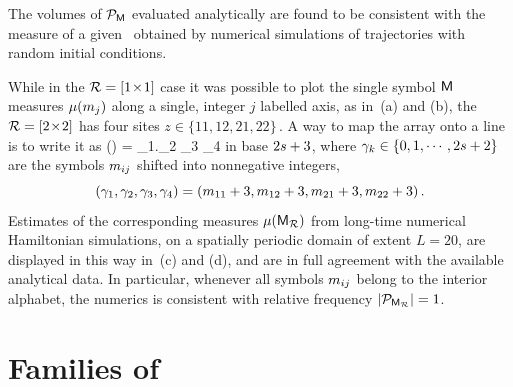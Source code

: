 \documentclass[12pt]{iopart}
\begin{document}
The  volumes  of $\mathcal{P}_{\mathsf{M}}$ evaluated analytically are found to be
consistent with the measure  of a given {\brick} \Mm\ obtained by
numerical simulations of trajectories with random initial conditions.

While in the $\mathcal{R}=[1\!\times\!1]$ case it was possible to plot the single
symbol {\brick} $\mathsf{M}$ measures ${\mu}({m_{j}})$ along a single, integer
$j$ labelled axis, as in \,(a) and (b), the $\mathcal{R} =
[2\!\times\!2]$ has four sites
\(
z\in\{11,12,21,22\}
\,.
\)
A way to map the array  onto a line is to write it as
\beq
\gamma(\MmR) = \gamma_1.\gamma_2 \gamma_3 \gamma_4
in base $\edit{2s}+3$, where
$\gamma_k\in\{0,1,\cdots,\edit{2s}+2\}$ are the symbols $\Ssym{ij}$
shifted into nonnegative integers,
\[
(\gamma_1,\gamma_2,\gamma_3,\gamma_4)
= (\Ssym{11}+3,\Ssym{12}+3,\Ssym{21}+3,\Ssym{22}+3)
\,.
\]
Estimates of the corresponding measures ${\mu}({\mathsf{M}_{\mathcal{R}}})$  from long-time
numerical Hamiltonian simulations, on a spatially periodic domain of
extent $L=20$, are displayed in this way in \,(c)
and (d), and are in full agreement with the available analytical data. In
particular, whenever all symbols ${m_{ij}}$ belong to the interior
alphabet, the numerics is consistent with relative frequency
$|\mathcal{P}_{{\mathsf{M}_{\mathcal{R}}}}|=1$.

\section{Families of {\twots}}
\label{sect:twots}
\end{document}
